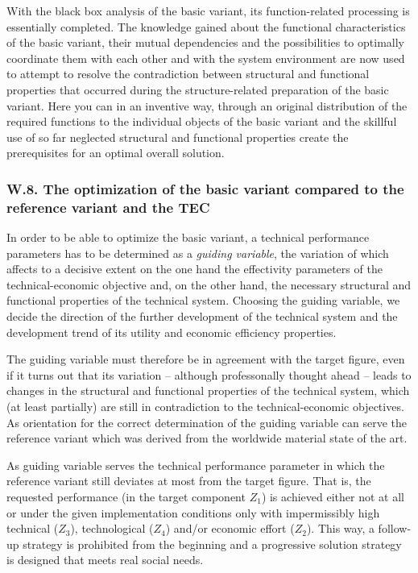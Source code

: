 \documentclass[11pt,a4paper]{article}
\begin{document}
With the black box analysis of the basic variant, its function-related
processing is essentially completed. The knowledge gained about the functional
characteristics of the basic variant, their mutual dependencies and the
possibilities to optimally coordinate them with each other and with the system
environment are now used to attempt to resolve the contradiction between
structural and functional properties that occurred during the
structure-related preparation of the basic variant.  Here you can in an
inventive way, through an original distribution of the required functions to
the individual objects of the basic variant and the skillful use of so far
neglected structural and functional properties create the prerequisites for an
optimal overall solution.

\subsubsection*{W.8. The optimization of the basic variant compared to the
  reference variant and the TEC}

In order to be able to optimize the basic variant, a technical performance
parameters has to be determined as a \emph{guiding variable}, the variation of
which affects to a decisive extent on the one hand the effectivity parameters
of the technical-economic objective and, on the other hand, the necessary
structural and functional properties of the technical system. Choosing the
guiding variable, we decide the direction of the further development of the
technical system and the development trend of its utility and economic
efficiency properties.

The guiding variable must therefore be in agreement with the target figure,
even if it turns out that its variation -- although professonally thought
ahead -- leads to changes in the structural and functional properties of the
technical system, which (at least partially) are still in contradiction to the
technical-economic objectives. As orientation for the correct determination of
the guiding variable can serve the reference variant which was derived from
the worldwide material state of the art.

As guiding variable serves the technical performance parameter in which the
reference variant still deviates at most from the target figure.  That is, the
requested performance (in the target component $Z_1$) is achieved either not
at all or under the given implementation conditions only with impermissibly
high technical ($Z_3$), technological ($Z_4$) and/or economic effort ($Z_2$).
This way, a follow-up strategy is prohibited from the beginning and a
progressive solution strategy is designed that meets real social needs.
\end{document}
